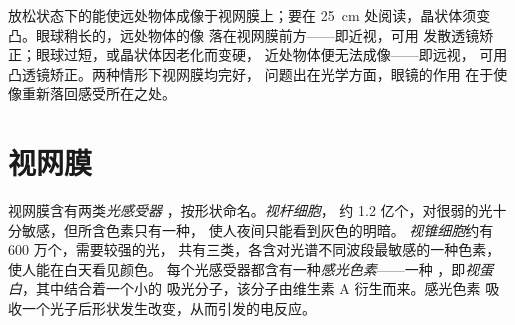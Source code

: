 \begin{example}[焦点及其缺陷]\label{ex:g11:the-eye:focus}
放松状态下的能使远处物体成像于视网膜上；要在
\qty{25}{cm} 处阅读，晶状体须变凸。眼球稍长的，远处物体的像
落在视网膜前方——即近视，可用
发散透镜矫正；眼球过短，或晶状体因老化而变硬，
近处物体便无法成像——即远视，
可用凸透镜矫正。两种情形下视网膜均完好，
问题出在光学方面，眼镜的作用
在于使像重新落回感受所在之处。
\end{example}

\section{视网膜}

\begin{definition}[光感受器]\label{def:g11:the-eye:photoreceptors}
视网膜含有两类\emph{光感受器}
，按形状命名。\emph{视杆细胞}，
约 1.2 亿个，对很弱的光十分敏感，但所含色素只有一种，
使人夜间只能看到灰色的明暗。
\emph{视锥细胞}约有 600 万个，需要较强的光，
共有三类，各含对光谱不同波段最敏感的一种色素，
使人能在白天看见颜色。
每个光感受器都含有一种\emph{感光色素}——一种
，即\emph{视蛋白}，其中结合着一个小的
吸光分子，该分子由维生素 A 衍生而来。感光色素
吸收一个光子后形状发生改变，从而引发的电反应。
\end{definition}

